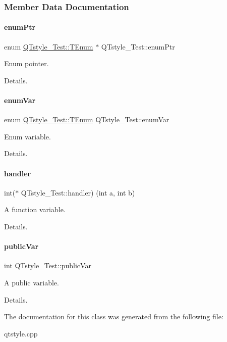 \subsubsection{Member Data Documentation}
\hypertarget{class_q_tstyle___test_a973a4566c9a036f4eca508ba5fe80dcb}{}\label{class_q_tstyle___test_a973a4566c9a036f4eca508ba5fe80dcb} 
\paragraph{\texorpdfstring{enum\+Ptr}{enumPtr}}
{\footnotesize\ttfamily enum \hyperlink{class_q_tstyle___test_a0525f798cda415a94fedeceb806d2c49}{Q\+Tstyle\+\_\+\+Test\+::\+T\+Enum}
         $\ast$ Q\+Tstyle\+\_\+\+Test\+::enum\+Ptr}



Enum pointer. 

Details. \hypertarget{class_q_tstyle___test_adb265d815b43f1f7f0de0e8b8852a5d0}{}\label{class_q_tstyle___test_adb265d815b43f1f7f0de0e8b8852a5d0} 
\paragraph{\texorpdfstring{enum\+Var}{enumVar}}
{\footnotesize\ttfamily enum \hyperlink{class_q_tstyle___test_a0525f798cda415a94fedeceb806d2c49}{Q\+Tstyle\+\_\+\+Test\+::\+T\+Enum}
          Q\+Tstyle\+\_\+\+Test\+::enum\+Var}



Enum variable. 

Details. \hypertarget{class_q_tstyle___test_a79dd4e5498f09057775a819d911349e2}{}\label{class_q_tstyle___test_a79dd4e5498f09057775a819d911349e2} 
\paragraph{\texorpdfstring{handler}{handler}}
{\footnotesize\ttfamily int($\ast$ Q\+Tstyle\+\_\+\+Test\+::handler) (int a, int b)}



A function variable. 

Details. \hypertarget{class_q_tstyle___test_aabf7b2e9ed83ea44aca4d213baae06d3}{}\label{class_q_tstyle___test_aabf7b2e9ed83ea44aca4d213baae06d3} 
\paragraph{\texorpdfstring{public\+Var}{publicVar}}
{\footnotesize\ttfamily int Q\+Tstyle\+\_\+\+Test\+::public\+Var}



A public variable. 

Details. 

The documentation for this class was generated from the following file\+:\begin{DoxyCompactItemize}
\item 
qtstyle.\+cpp\end{DoxyCompactItemize}

